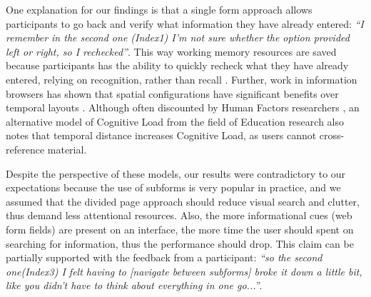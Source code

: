 \documentclass[../main/Replicate.tex]{subfiles}
\begin{document}
	One explanation for our findings is that a single form approach allows participants to go back and verify what information they have already entered: \textit{``I remember in the second one (Index1) I'm not sure whether the option provided left or right, so I rechecked''}.
	This way working memory resources are saved because participants has the ability to quickly recheck what they have already entered, relying on recognition, rather than recall \cite{nielsen1990heuristic}. Further, work in information browsers has shown that spatial configurations have significant benefits over temporal layouts \cite{eps258800}. Although often discounted by Human Factors researchers \cite{wilson2015evaluation}, an alternative model of Cognitive Load from the field of Education research \cite{sweller1988cognitive} also notes that temporal distance increases Cognitive Load, as users cannot cross-reference material.
	
	Despite the perspective of these models, our results were contradictory to our expectations because the use of subforms is very popular in practice, and we assumed that the divided page approach should reduce visual search and clutter, thus demand less attentional resources.
	Also, the more informational cues (web form fields) are present on an interface, the more time the user should spent on searching for information, thus the performance should drop.
	This claim can be partially supported with the feedback from a participant: \textit{``so the second one(Index3) I felt having to [navigate between subforms] broke it down a little bit, like you didn't have to think about everything in one go...''}.
\end{document}
